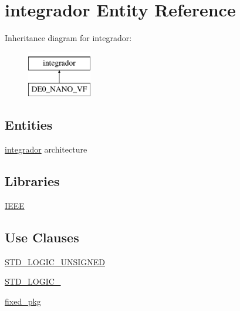 \hypertarget{classintegrador}{}\section{integrador Entity Reference}
\label{classintegrador}
Inheritance diagram for integrador\+:\begin{figure}[H]
\begin{center}
\leavevmode
\includegraphics[height=2.000000cm]{classintegrador}
\end{center}
\end{figure}
\subsection*{Entities}
\begin{DoxyCompactItemize}
\item 
\hyperlink{classintegrador_1_1integrador}{integrador} architecture
\end{DoxyCompactItemize}
\subsection*{Libraries}
 \begin{DoxyCompactItemize}
\item 
\hyperlink{classintegrador_ae4f03c286607f3181e16b9aa12d0c6d4}{I\+E\+E\+E} 
\end{DoxyCompactItemize}
\subsection*{Use Clauses}
 \begin{DoxyCompactItemize}
\item 
\hyperlink{classintegrador_a241c3e72dd8024cc8ae831b1b2aed7db}{S\+T\+D\+\_\+\+L\+O\+G\+I\+C\+\_\+\+U\+N\+S\+I\+G\+N\+E\+D}   
\item 
\hyperlink{classintegrador_aa4b2b25246a821511120e3149b003563}{S\+T\+D\+\_\+\+L\+O\+G\+I\+C\+\_}   
\item 
\hyperlink{classintegrador_aad86249c80e8c1e7ee1c4748aba748e3}{fixed\+\_\+pkg}   
\end{DoxyCompactItemize}

